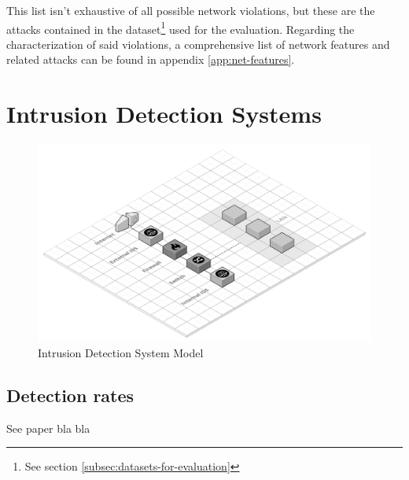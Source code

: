 This list isn't exhaustive of all possible network violations, but these are the attacks contained in the dataset\footnote{See section \ref{subsec:datasets-for-evaluation}} used for the evaluation. Regarding the characterization of said violations, a comprehensive list of network features and related attacks can be found in appendix \ref{app:net-features}.


\section{Intrusion Detection Systems}
\label{sec:intrusion-detection-system}

\lipsum[1-4]

    \begin{figure}[h!]
        \centering
        \includegraphics[scale=0.23]{figures/Intrusion Detection System Model.png}
        \caption{Intrusion Detection System Model}
        \label{fig:IDS-model}
    \end{figure}


\subsection{Detection rates}

See paper bla bla


